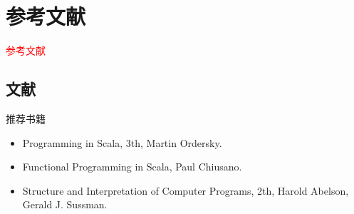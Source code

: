\section{参考文献}
\label{sec:reference}

\begin{frame}
  \begin{center}
    \Huge{\textcolor{red}{参考文献}}
  \end{center}
\end{frame}

\subsection{文献}

\begin{frame}{推荐书籍}
    \begin{itemize}
    \item \alert{Programming in Scala, 3th}, Martin Ordersky.
    \item \alert{Functional Programming in Scala}, Paul Chiusano.
    \item \alert{Structure and Interpretation of Computer Programs, 2th}, Harold Abelson, Gerald J. Sussman.
    \end{itemize}
\end{frame}